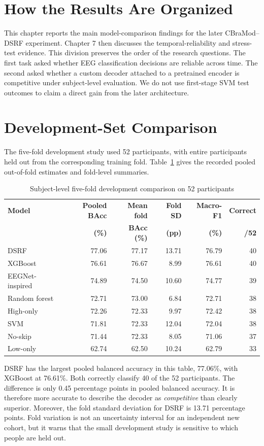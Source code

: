 \section{How the Results Are Organized}
This chapter reports the main model-comparison findings for the later CBraMod--DSRF experiment. Chapter 7 then discusses the temporal-reliability and stress-test evidence. This division preserves the order of the research questions. The first task asked whether EEG classification decisions are reliable across time. The second asked whether a custom decoder attached to a pretrained encoder is competitive under subject-level evaluation. We do not use first-stage SVM test outcomes to claim a direct gain from the later architecture.

\section{Development-Set Comparison}
The five-fold development study used 52 participants, with entire participants held out from the corresponding training fold. Table~\ref{tab:dev-results} gives the recorded pooled out-of-fold estimates and fold-level summaries.
\begin{table}[htbp]\centering\footnotesize
\caption{Subject-level five-fold development comparison on 52 participants}\label{tab:dev-results}
\begin{tabular}{@{}lrrrrr@{}}\toprule
\textbf{Model}&\textbf{Pooled BAcc}&\textbf{Mean fold}&\textbf{Fold SD}&\textbf{Macro-F1}&\textbf{Correct}\\
&\textbf{(\%)}&\textbf{BAcc (\%)}&\textbf{(pp)}&\textbf{(\%)}&\textbf{/52}\\\midrule
DSRF&77.06&77.17&13.71&76.79&40\\
XGBoost&76.61&76.67&8.99&76.61&40\\
EEGNet-inspired&74.89&74.50&10.60&74.77&39\\
Random forest&72.71&73.00&6.84&72.71&38\\
High-only&72.26&72.33&9.97&72.42&38\\
SVM&71.81&72.33&12.04&72.04&38\\
No-skip&71.44&72.33&8.05&71.06&37\\
Low-only&62.74&62.50&10.24&62.79&33\\
\bottomrule\end{tabular}\end{table}

DSRF has the largest pooled balanced accuracy in this table, 77.06\%, with XGBoost at 76.61\%. Both correctly classify 40 of the 52 participants. The difference is only 0.45 percentage points in pooled balanced accuracy. It is therefore more accurate to describe the decoder as \emph{competitive} than clearly superior. Moreover, the fold standard deviation for DSRF is 13.71 percentage points. Fold variation is not an uncertainty interval for an independent new cohort, but it warns that the small development study is sensitive to which people are held out.

